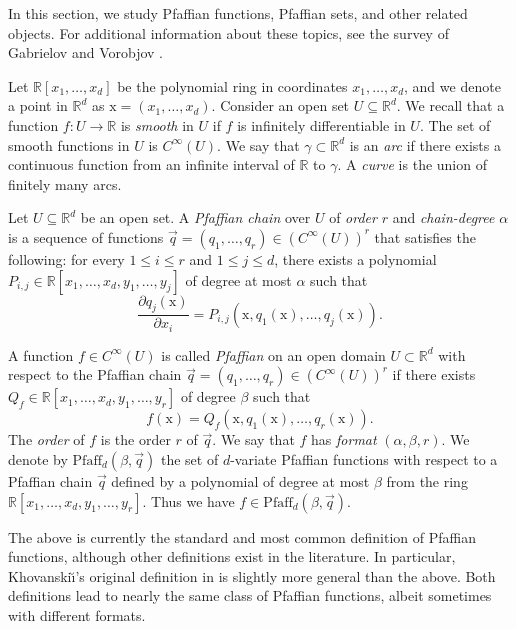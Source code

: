 \documentclass[11pt]{article}
\theoremstyle{definition}
\newcommand{\parag}[1]{\vspace{2mm}
\noindent{\bf #1} }
\newcommand{\RR}{\mathbb R}
\newcommand{\vecx}{\mathrm{x}}
\newcommand{\Pf}{\mathrm{Pfaff}}
\begin{document}
In this section, we study Pfaffian functions, Pfaffian sets, and other related objects.
For additional information about these topics, see the survey of Gabrielov and Vorobjov \cite{GV04}.

Let $\RR[x_1, \ldots, x_d]$ be the polynomial ring in coordinates $x_1, \ldots, x_d$, and we denote a point in $\RR^d$ as $\vecx = (x_1, \ldots, x_d)$.
Consider an open set $U \subseteq \RR^d$.
We recall that a function $f: U\to \RR$ is \emph{smooth} in $U$ if $f$ is infinitely differentiable in $U$.
The set of smooth functions in $U$ is $C^\infty(U)$.
We say that $\gamma\subset\RR^d$ is an \emph{arc} if there exists a continuous function from an infinite interval of $\RR$ to $\gamma$.
A \emph{curve} is the union of finitely many arcs.

\parag{Pfaffian chains and Pfaffian functions.}
Let $U\subseteq \RR^d$ be an open set.
A \emph{Pfaffian chain} over $U$ of \emph{order} $r$ and  \emph{chain-degree} $\alpha$  is a sequence of functions $\vec{q} = (q_1, \ldots, q_r) \in (C^{\infty}(U))^r$ that satisfies the following:
for every $1\le i \le r$ and $1 \le j \le d$, there exists a polynomial $P_{i, j} \in \RR[x_1, \ldots, x_d, y_1, \ldots, y_j]$ of degree at most $\alpha$ such that 
\begin{equation} \label{eq:pfaffian-differential-condition}
\frac{\partial q_j(\vecx)}{\partial x_i}   = P_{i,j}(\vecx, q_1(\vecx), \ldots, q_j(\vecx)).
\end{equation}

A function $f \in C^\infty(U)$ is called \emph{Pfaffian} on an open domain $U\subset \RR^d$ with respect to the Pfaffian chain $\vec{q} = (q_1, \ldots, q_r) \in (C^{\infty}(U))^r$ if there exists $Q_f \in \RR[x_1, \ldots, x_d, y_1, \ldots, y_r]$ of degree $\beta$ such that
%
\begin{equation} \label{eq:PfaffianFunc} 
f(\vecx) = Q_f(\vecx, q_1(\vecx), \ldots, q_r(\vecx)). 
\end{equation}
%
The \emph{order} of $f$ is the order $r$ of $\vec{q}$.
We say that $f$ has  \emph{format} $(\alpha,\beta,r)$.
We denote by $\Pf_d(\beta,\vec{q})$ the set of $d$-variate Pfaffian functions with respect to a Pfaffian chain $\vec{q}$ defined by a polynomial of degree at most $\beta$ from the ring $\RR[x_1, \ldots, x_d, y_1, \ldots, y_r]$. Thus we have $f\in \Pf_d(\beta, \vec{q})$.

The above is currently the standard and most common definition of Pfaffian functions, although other definitions exist in the literature. 
In particular, Khovanski{\u\i}'s original definition in \cite{Khovanskii91} is slightly more general than the above. Both definitions lead to nearly the same class of Pfaffian functions, albeit sometimes with different formats.
\end{document}
